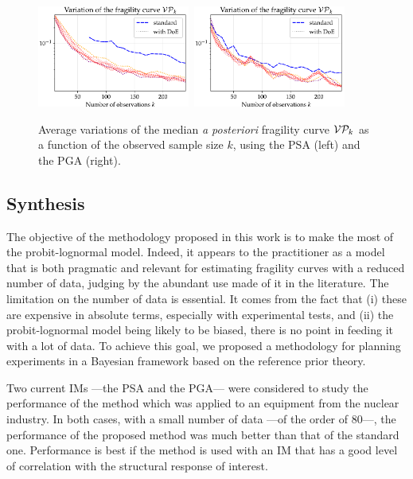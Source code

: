     
    \begin{figure}[h]
        \centering%
        \includegraphics[width=5cm]{figures/DoE/VariaP_PSA.pdf}\ 
        \includegraphics[width=5cm]{figures/DoE/VariaP_PGA.pdf}
        \caption{Average variations of the median \emph{a posteriori} fragility curve $\mathcal{V}\mathcal{P}_k$ as a function of the observed sample size $k$, using the PSA (left) and the PGA (right).}
        \label{fig:doe:variaP}
    \end{figure}



    \subsection{Synthesis}




    The objective of the methodology proposed in this work is to make the most of the {probit-}lognormal model. Indeed, it appears to the practitioner as a model that is both pragmatic and relevant for estimating fragility curves with a reduced number of data, judging by the abundant use made of it in the literature. The {limitation} on the number of data is essential. It comes from the fact that (i) these are expensive in absolute terms, especially %
with experimental tests, and (ii) the {probit-}lognormal model being likely to be biased, there is no point in feeding it with a lot of data. To achieve this goal, we proposed a methodology for planning experiments in a Bayesian framework based on the reference prior theory.

Two current IMs ---the PSA and the PGA--- were considered to study the performance of the method which was applied to an equipment from the nuclear industry. In both cases, with a small number of data ---of the order of 80---, the performance of the proposed method was much better than that of the standard one. Performance is best if the method is used with an IM that has a good level of correlation with the structural response of interest.

